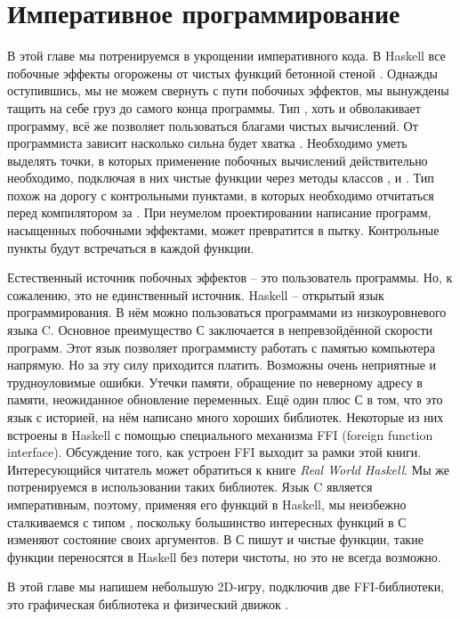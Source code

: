 \setcounter{chapter}{19}
\chapter{Императивное программирование}

В этой главе мы потренируемся в укрощении императивного 
кода. В Haskell все побочные эффекты огорожены от
чистых функций бетонной стеной .
Однажды оступившись, мы не можем свернуть с пути побочных 
эффектов, мы вынуждены тащить на себе груз 
до самого конца программы. 
Тип  , хоть и обволакивает программу, всё же
позволяет пользоваться благами чистых вычислений.
От программиста зависит насколько сильна будет хватка .
Необходимо уметь выделять точки, в которых применение
побочных вычислений действительно необходимо, 
подключая в них чистые функции через методы классов 
,  и  .
Тип  похож на дорогу с контрольными пунктами, 
в которых необходимо отчитаться
перед компилятором за . При неумелом
проектировании написание программ, насыщенных
побочными эффектами, может превратится в пытку. 
Контрольные пункты будут встречаться в каждой функции.


Естественный источник побочных эффектов -- это пользователь программы.
Но, к сожалению, это не единственный источник. Haskell
-- открытый язык программирования. В нём можно пользоваться
программами из низкоуровневого языка C. Основное преимущество 
С заключается в непревзойдённой скорости программ. 
Этот язык позволяет программисту работать с памятью компьютера
напрямую. Но за эту силу приходится платить. 
Возможны очень неприятные и трудноуловимые ошибки. 
Утечки памяти, обращение по неверному адресу в памяти, 
неожиданное обновление переменных. Ещё один плюс С
в том, что это язык с историей, на нём написано много хороших
библиотек. Некоторые из них встроены в Haskell с помощью
специального механизма FFI (foreign function interface).
Обсуждение того, как устроен FFI выходит за рамки этой книги.
Интересующийся читатель может обратиться к книге 
\emph{Real World Haskell}. Мы же потренируемся в 
использовании таких библиотек. Язык C является императивным,
поэтому, применяя его функций в Haskell, мы неизбежно
сталкиваемся с типом , поскольку большинство
интересных функций в С изменяют состояние своих аргументов.
В С пишут и чистые функции, такие функции 
переносятся в Haskell без потери чистоты, но 
это не всегда возможно. 

В этой главе мы напишем небольшую 2D-игру, подключив
две FFI-библиотеки, это графическая библиотека 
и физический движок .

